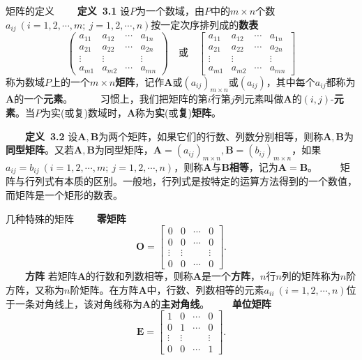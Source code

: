 \documentclass[compress,mathserif,cjk]{beamer}
\theoremstyle{remark}
\numberwithin{equation}{section}
\newcommand{\hei}{\bf}      %
\begin{document}
\begin{CJK}{UTF8}{gbsn}
\begin{frame}{矩阵的定义}
 \ \ \ \ {\hei 定义~3.1} 设$P$为一个数域，由$P$中的$m\times n$个数$a_{ij}~(i=1,2,\cdots,m;~j=1,2,\cdots,n)$按一定次序排列成的{\hei 数表}
 $$\left(\begin{matrix}a_{11}&a_{12}&\cdots&a_{1n}\\a_{21}&a_{22}&\cdots&a_{2n}\\ \vdots&\vdots&&\vdots\\a_{m1}&a_{m2}&\cdots&a_{mn}\end{matrix}\right)\hspace{1em}\mbox{或}\hspace{1em}
 \left[\begin{matrix}a_{11}&a_{12}&\cdots&a_{1n}\\a_{21}&a_{22}&\cdots&a_{2n}\\ \vdots&\vdots&&\vdots\\a_{m1}&a_{m2}&\cdots&a_{mn}\end{matrix}\right]$$
 称为数域$P$上的一个$m\times n${\hei 矩阵}，记作$\bm A$或$(a_{ij})_{m\times n}$或$(a_{ij})$，其中每个$a_{ij}$都称为$\bm A$的一个{\hei 元素}。
 \pause\vskip 5pt
 \ \ \ \ \ 习惯上，我们把矩阵的第$i$行第$j$列元素叫做$\bm A$的$(i,j)$-{\hei 元素}。当$P$为实(或复)数域时，$\bm A$称为{\hei 实}(或{\hei 复}){\hei 矩阵}。
\end{frame}

\begin{frame}
 \ \ \ \ {\hei 定义~3.2} 设$\bm A,\bm B$为两个矩阵，如果它们的行数、列数分别相等，则称$\bm A,\bm B$为{\hei 同型矩阵}。又若$\bm A,\bm B$为同型矩阵，$\bm A=(a_{ij})_{m\times n},\bm B=(b_{ij})_{m\times n}$，如果$a_{ij}=b_{ij}~(i=1,2,\cdots,m;~j=1,2,\cdots,n)$，则称$\bm A$与$\bm B${\hei 相等}，记为$\bm A=\bm B$。
 \pause\vskip 10pt
 \ \ \ \ 矩阵与行列式有本质的区别。一般地，行列式是按特定的运算方法得到的一个数值，而矩阵是一个矩形的数表。
\end{frame}

\begin{frame}{几种特殊的矩阵}
 \ \ \ \ {\hei 零矩阵} $$\bm O=\left[\begin{matrix}0&0&\cdots&0\\0&0&\cdots&0\\ \vdots&\vdots&&\vdots\\0&0&\cdots&0\end{matrix}\right].$$
 \pause\vskip 5pt
 \ \ \ \ {\hei 方阵} 若矩阵$\bm A$的行数和列数相等，则称$\bm A$是一个{\hei 方阵}，$n$行$n$列的矩阵称为$n$阶方阵，又称为$n$阶矩阵。在方阵$\bm A$中，行数、列数相等的元素$a_{ii}~(i=1,2,\cdots,n)$位于一条对角线上，该对角线称为$\bm A$的{\hei 主对角线}。
 \pause\vskip 5pt
 \ \ \ \ {\hei 单位矩阵} $$\bm E=\left[\begin{matrix}1&0&\cdots&0\\0&1&\cdots&0\\ \vdots&\vdots&&\vdots\\0&0&\cdots&1\end{matrix}\right].$$
\end{frame}


\end{CJK}
\end{document}
